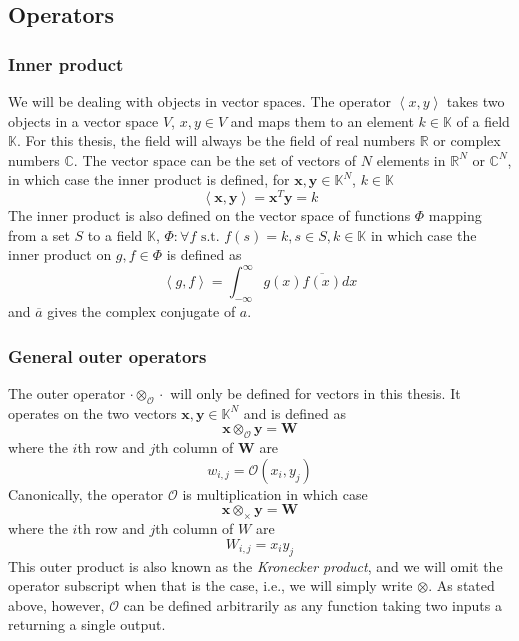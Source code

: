 \subsection{Operators}

\subsubsection{Inner product}

We will be dealing with objects in vector spaces. The operator $\left\langle
x, y \right\rangle$ takes two objects in a vector space $V$, $x,y \in V$ and maps
them to an element $k \in \mathbb{K}$ of a field $\mathbb{K}$.
For this thesis, the field will always be the field of real numbers
$\mathbb{R}$ or complex numbers $\mathbb{C}$. The vector space can be the set of
vectors of $N$ elements in $\mathbb{R}^{N}$ or $\mathbb{C}^{N}$, in which case
the inner product is defined, for $\boldsymbol{x},\boldsymbol{y} \in
\mathbb{K}^{N}$, $k \in \mathbb{K}$
\[
    \left\langle  \boldsymbol{x}, \boldsymbol{y} \right\rangle =
\boldsymbol{x}^{T} \boldsymbol{y} = k
\]
The inner product is also defined on
the vector space of functions $\Phi$
mapping from a set $S$ to a field $\mathbb{K}$, $\Phi : \forall f \text{ s.t. } f(s) = k, s \in S,k \in
\mathbb{K} $ in which case the inner product on $g,f \in \Phi$ is
defined as
\[
    \left\langle  g, f \right\rangle =
\int_{-\infty}^{\infty} g(x) \overline{f(x)} dx
\]
and $\overline{a}$ gives the complex conjugate of $a$.

\subsubsection{General outer operators}

The outer operator $\cdotp \otimes_{\mathcal{O}} \cdotp$ will only be defined for
vectors in this thesis. It operates on the two vectors $\boldsymbol{x},\boldsymbol{y} \in
\mathbb{K}^{N}$ and is defined as
\[
    \boldsymbol{x} \otimes_{\mathcal{O}} \boldsymbol{y} = \boldsymbol{W}
\] where the $i$th row and $j$th column of $\boldsymbol{W}$ are
\[
    w_{i,j} = \mathcal{O} (x_{i},y_{j})
\]
Canonically, the operator $\mathcal{O}$ is multiplication in which case
\[
    \boldsymbol{x} \otimes_{\times} \boldsymbol{y} = \boldsymbol{W}
\] where the $i$th row and $j$th column of $W$ are
\[
    W_{i,j} = x_{i} y_{j}
\]
This outer product is also known as the \textit{Kronecker product}, and we will
omit the operator subscript when that is the case, i.e., we will simply write $\otimes$.  As stated
above, however, $\mathcal{O}$ can be defined arbitrarily as any function taking
two inputs a returning a single output.


